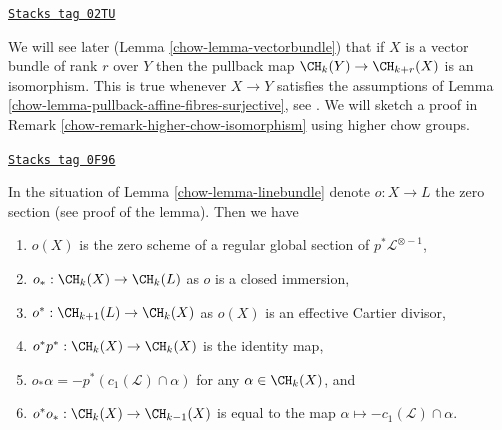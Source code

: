\begin{remark}
\label{chow-remark-when-isomorphism}
\href{https://stacks.math.columbia.edu/tag/02TU}{\texttt{Stacks tag 02TU}}

We will see later (Lemma \ref{chow-lemma-vectorbundle}) that if $X$ is a
vector bundle of rank $r$ over $Y$ then the pullback map
$\CH_k(Y) \to \CH_{k + r}(X)$
is an isomorphism. This is true whenever $X \to Y$ satisfies
the assumptions of Lemma \ref{chow-lemma-pullback-affine-fibres-surjective}, see
\cite[Lemma 2.2]{Totaro-group}. We will sketch a proof in
Remark \ref{chow-remark-higher-chow-isomorphism} using higher chow groups.
\end{remark}

\begin{lemma}
\label{chow-lemma-linebundle-formulae}
\href{https://stacks.math.columbia.edu/tag/0F96}{\texttt{Stacks tag 0F96}}

In the situation of Lemma \ref{chow-lemma-linebundle} denote $o : X \to L$
the zero section (see proof of the lemma). Then we have
\begin{enumerate}
\item $o(X)$ is the zero scheme of a regular global section of
$p^*\mathcal{L}^{\otimes -1}$,
\item $o_* : \CH_k(X) \to \CH_k(L)$ as $o$ is a closed immersion,
\item $o^* : \CH_{k + 1}(L) \to \CH_k(X)$ as $o(X)$
is an effective Cartier divisor,
\item $o^* p^* : \CH_k(X) \to \CH_k(X)$ is the identity map,
\item $o_*\alpha = - p^*(c_1(\mathcal{L}) \cap \alpha)$ for any
$\alpha \in \CH_k(X)$, and
\item $o^* o_* : \CH_k(X) \to \CH_{k - 1}(X)$ is equal to the map
$\alpha \mapsto - c_1(\mathcal{L}) \cap \alpha$.
\end{enumerate}
\end{lemma}

